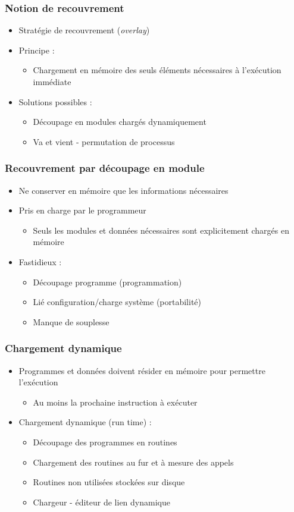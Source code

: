 \begin{frame}
\frametitle{Notion de recouvrement}
\begin{itemize}
\item Stratégie de recouvrement (\textit{overlay})
\item Principe :
\begin{itemize}
\item Chargement en mémoire des seuls éléments nécessaires à l'exécution immédiate
\end{itemize}
\item Solutions possibles :
\begin{itemize}
\item Découpage en modules chargés dynamiquement
\item Va et vient - permutation de processus
\end{itemize}
\end{itemize}
\end{frame}

\begin{frame}
\frametitle{Recouvrement par découpage en module}
\begin{itemize}
\item Ne conserver en mémoire que les informations nécessaires
\item Pris en charge par le programmeur
\begin{itemize}
\item Seuls les modules et données nécessaires sont explicitement chargés en mémoire
\end{itemize}
\item Fastidieux :
\begin{itemize}
\item Découpage programme (programmation)
\item Lié configuration/charge système (portabilité)
\item Manque de souplesse
\end{itemize}
\end{itemize}
\end{frame}

\begin{frame}
\frametitle{Chargement dynamique}
\begin{itemize}
\item Programmes et données doivent résider en mémoire pour permettre l'exécution
\begin{itemize}
\item Au moins la prochaine instruction à exécuter
\end{itemize}
\item Chargement dynamique (run time) :
\begin{itemize}
\item Découpage des programmes en routines
\item Chargement des routines au fur et à mesure des appels
\item Routines non utilisées stockées sur disque
\item Chargeur - éditeur de lien dynamique
\end{itemize}
\end{itemize}
\end{frame}

